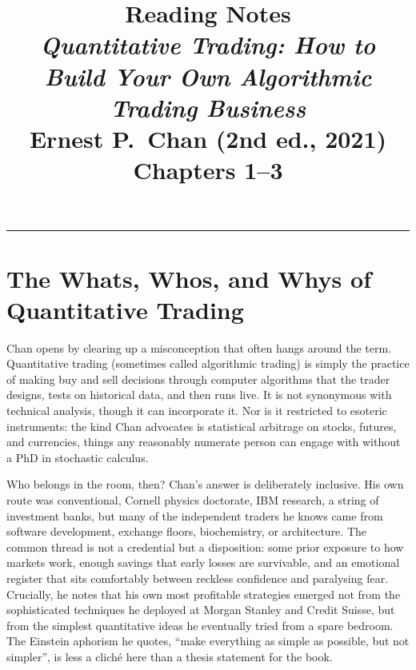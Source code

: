 \documentclass[12pt, a4paper]{article}
\title{%
    \Large\textbf{Reading Notes}\\[0.4em]
    \large\textit{Quantitative Trading: How to Build Your Own Algorithmic Trading Business}\\[0.3em]
    \normalsize Ernest P.\ Chan \quad\textcolor{accentgray}{(2nd ed., 2021)}\\[0.2em]
    \normalsize Chapters 1--3
}
\author{}
\date{}
\begin{document}
\maketitle
\thispagestyle{empty}

\tableofcontents
\newpage

\vspace{-1em}
\textcolor{accentgray}{\hrule}
\vspace{1.5em}


\section{The Whats, Whos, and Whys of Quantitative Trading}

Chan opens by clearing up a misconception that often hangs around the term. Quantitative trading (sometimes called algorithmic trading) is simply the practice of making buy and sell decisions through computer algorithms that the trader designs, tests on historical data, and then runs live. It is not synonymous with technical analysis, though it can incorporate it. Nor is it restricted to esoteric instruments: the kind Chan advocates is statistical arbitrage on stocks, futures, and currencies, things any reasonably numerate person can engage with without a PhD in stochastic calculus.

Who belongs in the room, then? Chan's answer is deliberately inclusive. His own route was conventional, Cornell physics doctorate, IBM research, a string of investment banks, but many of the independent traders he knows came from software development, exchange floors, biochemistry, or architecture. The common thread is not a credential but a disposition: some prior exposure to how markets work, enough savings that early losses are survivable, and an emotional register that sits comfortably between reckless confidence and paralysing fear. Crucially, he notes that his own most profitable strategies emerged not from the sophisticated techniques he deployed at Morgan Stanley and Credit Suisse, but from the simplest quantitative ideas he eventually tried from a spare bedroom. The Einstein aphorism he quotes, ``make everything as simple as possible, but not simpler'', is less a clich\'{e} here than a thesis statement for the book.
\end{document}
